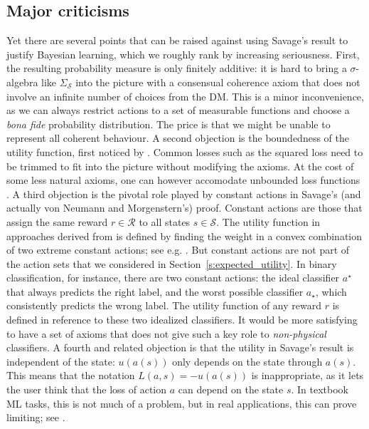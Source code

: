 \subsection{Major criticisms}
Yet there are several points that can be raised against using Savage's result to justify Bayesian learning, which we roughly rank by increasing seriousness. 
First, the resulting probability measure is only finitely additive: it is hard to bring a $\sigma$-algebra like $\Sigma_\mathcal{S}$ into the picture with a consensual coherence axiom that does not involve an infinite number of choices from the DM. 
This is a minor inconvenience, as we can always restrict actions to a set of measurable functions and choose a \emph{bona fide} probability distribution.
The price is that we might be unable to represent all coherent behaviour.
A second objection is the boundedness of the utility function, first noticed by \citep{Fis70}. 
Common losses such as the squared loss need to be trimmed to fit into the picture without modifying the axioms.
At the cost of some less natural axioms, one can however accomodate unbounded loss functions \citep{Wak93}.
A third objection is the pivotal role played by constant actions in Savage's (and actually von Neumann and Morgenstern's) proof.
Constant actions are those that assign the same reward $r\in\mathcal{R}$ to all states $s\in\mathcal{S}$.
The utility function in approaches derived from \cite{VoMo} is defined by finding the weight in a convex combination of two extreme constant actions; see e.g. \citep[Chapter 3]{PaIn09}. 
But constant actions are not part of the action sets that we considered in Section~\ref{s:expected_utility}.
In binary classification, for instance, there are two constant actions: the ideal classifier $a^\star$ that always predicts the right label, and the worst possible classifier $a_\star$, which consistently predicts the wrong label. 
The utility function of any reward $r$ is defined in reference to these two idealized classifiers.  
It would be more satisfying to have a set of axioms that does not give such a key role to \emph{non-physical} classifiers. 
A fourth and related objection is that the utility in Savage's result is independent of the state: $u(a(s))$ only depends on the state through $a(s)$. 
This means that the notation $L(a,s) = -u(a(s))$ is inappropriate, as it lets the user think that the loss of action $a$ can depend on the state $s$. 
In textbook ML tasks, this is not much of a problem, but in real applications, this can prove limiting; see \citep[Chapter XXX]{PaIn09}.

